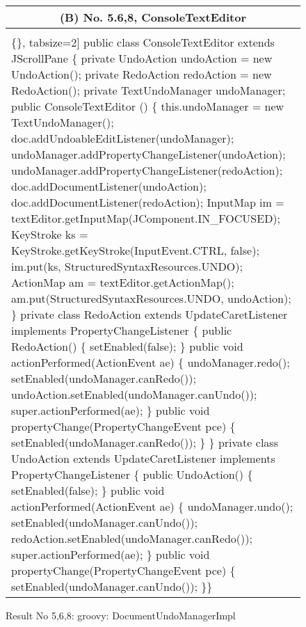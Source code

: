\begin{figure}[!htb]
 \begin{minipage}{0.5\textwidth}
\scriptsize 
\begin{tabular}{@{}p{}} 
 \hline 
  \multicolumn{1}{c}{(B) No. 5.6,8, ConsoleTextEditor} \\ \hline
  \vspace{-4mm}
\begin{Verbatim}[commandchars=\\\{\}, tabsize=2]
public class ConsoleTextEditor extends JScrollPane \{
  private UndoAction undoAction = new UndoAction();
    private RedoAction redoAction = new RedoAction();
    private TextUndoManager undoManager;
    public ConsoleTextEditor () \{
     this.undoManager = new TextUndoManager();
     doc.addUndoableEditListener(undoManager);
     undoManager.addPropertyChangeListener(undoAction);
     undoManager.addPropertyChangeListener(redoAction);
     doc.addDocumentListener(undoAction);
     doc.addDocumentListener(redoAction);
     InputMap im = textEditor.getInputMap(JComponent.IN_FOCUSED);
     KeyStroke ks = KeyStroke.getKeyStroke(InputEvent.CTRL, false);
     im.put(ks, StructuredSyntaxResources.UNDO);
     ActionMap am = textEditor.getActionMap();
     am.put(StructuredSyntaxResources.UNDO, undoAction);
  \}
 private class RedoAction extends UpdateCaretListener
  implements PropertyChangeListener \{
  public RedoAction() \{
   setEnabled(false);
  \}
  public void actionPerformed(ActionEvent ae) \{
   undoManager.redo();
   setEnabled(undoManager.canRedo());
   undoAction.setEnabled(undoManager.canUndo());
   super.actionPerformed(ae);
  \}
    public void propertyChange(PropertyChangeEvent pce) \{
     setEnabled(undoManager.canRedo());
        \} \}
 private class UndoAction extends UpdateCaretListener 
 implements PropertyChangeListener \{
   public UndoAction() \{
    setEnabled(false);
   \}
   public void actionPerformed(ActionEvent ae) \{
    undoManager.undo();
    setEnabled(undoManager.canUndo());
    redoAction.setEnabled(undoManager.canRedo());
    super.actionPerformed(ae);
 \}
  public void propertyChange(PropertyChangeEvent pce) \{
    setEnabled(undoManager.canUndo());
  \}\}
  \end{Verbatim}
      \vspace{-4mm}
     \\ \hline
\end{tabular} 
\caption{Result No 5,6,8: groovy: DocumentUndoManagerImpl}
\label{fig:textEditor}
\end{minipage}
\end{figure}




